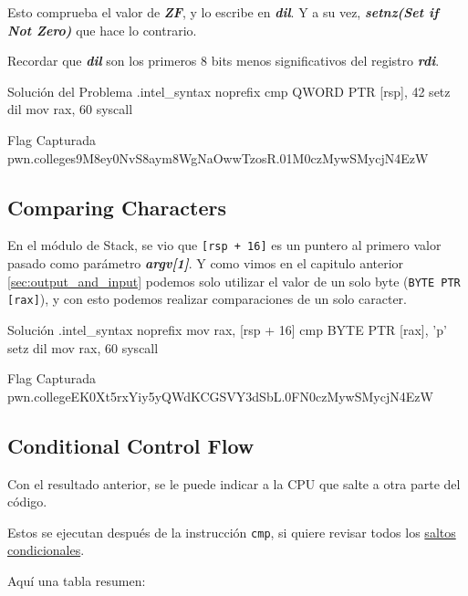Esto comprueba el valor de  \textbf{\textit{ZF}}, y lo escribe en \textbf{\textit{dil}}.
Y a su vez, \textbf{\textit{setnz(Set if Not Zero)}} que hace lo contrario.

Recordar que \textbf{\textit{dil}} son los primeros \( 8 \) bits menos significativos
del registro \textbf{\textit{rdi}}.
\begin{codebox}[ASM]{Solución del Problema}
	.intel_syntax noprefix
	cmp QWORD PTR [rsp], 42
	setz dil
	mov rax, 60
	syscall
\end{codebox}
\begin{flagbox}{Flag Capturada}
	pwn.college{s9M8ey0NvS8aym8WgNaOwwTzosR.01M0czMywSMycjN4EzW}
\end{flagbox}

\subsection{Comparing Characters} \label{subsec:comparing_characters}

En el módulo de Stack, se vio que \texttt{[rsp + 16]}
es un puntero al primero valor
pasado como parámetro \textbf{\textit{argv[1]}}. Y como vimos en el capitulo anterior \ref{sec:output_and_input}
podemos solo utilizar el valor de un solo byte (\texttt{BYTE PTR [rax]}), y con esto podemos realizar
comparaciones de un solo caracter.

\begin{codebox}[ASM]{Solución}
	.intel_syntax noprefix
	mov rax, [rsp + 16]
	cmp BYTE PTR [rax], 'p'
	setz dil
	mov rax, 60
	syscall
\end{codebox}

\begin{flagbox}{Flag Capturada}
	pwn.college{EK0Xt5rxYiy5yQWdKCGSVY3dSbL.0FN0czMywSMycjN4EzW}
\end{flagbox}

\subsection{Conditional Control Flow } \label{subsec:conditional_control_flow}

Con el resultado anterior, se le puede indicar a la CPU que salte a otra parte
del código.

Estos se ejecutan después de la instrucción \texttt{cmp}, si quiere
revisar todos los \href{https://www.felixcloutier.com/x86/jcc}{saltos condicionales}.

Aquí una tabla resumen:

